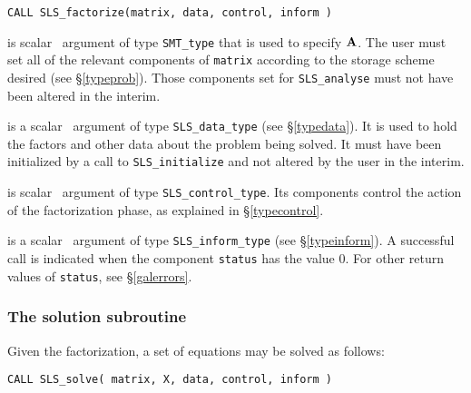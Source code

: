 \documentclass{galahad}
\newcommand{\packagename}{SLS}
\begin{document}
\hskip0.5in
{\tt CALL \packagename\_factorize(matrix, data, control, inform )}

\begin{description}

 is scalar \intentin\ argument of type {\tt SMT\_type}
that is used to specify ${\mathbf{A}}$.
The user must set all of the relevant components of {\tt matrix} according
to the storage scheme desired (see \S\ref{typeprob}). Those components
set for {\tt \packagename\_analyse} must not have been altered in the interim.

 is a scalar \intentinout\ argument of type
{\tt \packagename\_data\_type}
(see \S\ref{typedata}). It is used to hold the factors and other
data about the problem being solved.
It must have been initialized by a call to
{\tt \packagename\_ini\-tialize} and not altered by the user in the interim.

 is scalar \intentin\ argument of type
{\tt \packagename\_control\_type}. Its components control the action
of the factorization phase, as explained in
\S\ref{typecontrol}.

 is a scalar \intentinout\ argument of type
{\tt \packagename\_inform\_type}
(see \S\ref{typeinform}).
A successful call is indicated when the  component {\tt status} has the value 0.
For other return values of {\tt status}, see \S\ref{galerrors}.

\end{description}


\subsubsection{The solution subroutine}
\label{solve}
Given the factorization, a set of equations may be solved as follows:

\hskip0.5in
{\tt CALL \packagename\_solve( matrix, X, data, control, inform )}
\end{document}
